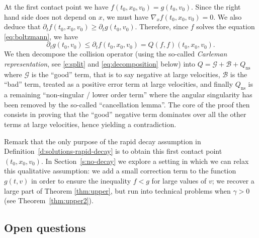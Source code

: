\documentclass[JEP,XML,SOM,Unicode,NoFloatCountersInSection]{cedram}
\newcommand{\ns}{\mathrm{ns}}
\theoremstyle{plain}
\theoremstyle{definition}
\numberwithin{equation}{section}
\begin{document}
At the first contact point we have $f(t_0,x_0,v_0)= g(t_0,v_0)$.
Since the right hand side does not depend on $x$, we must have
$\nabla_x f(t_0,x_0,v_0)=0$. We also deduce that
$\partial_t f(t_0,x_0,v_0) \geq \partial_t g(t_0,v_0)$. Therefore,
since $f$ solves the equation \eqref{eq:boltzmann}, we have
\begin{equation} \label{e:to-contradict} \partial_t g(t_0,v_0) \leq
\partial_t f (t_0,x_0,v_0)= Q(f,f) (t_0,x_0,v_0).
\end{equation}
We then decompose the collision operator (using the
so-called \emph{Carleman representation}, see \eqref{e:split} and
\eqref{eq:decomposition} below) into
$Q=\mathcal G + \mathcal B + Q_{\ns}$ where $\mathcal G$ is the
``good'' term, that is to say negative at large velocities,
$\mathcal B$ is the ``bad'' term, treated as a positive error term at
large velocities, and finally $Q_{\ns}$ is a remaining ``non-singular / lower order
term'' where the angular singularity has been
removed by the so-called ``cancellation lemma''. The core of the
proof then consists in proving that the ``good'' negative term
dominates over all the other terms at large velocities, hence yielding
a contradiction.

Remark that the only purpose of the rapid decay assumption in
Definition~\ref{d:solutions-rapid-decay} is to obtain this first
contact point $(t_0,x_0,v_0)$. In Section~\ref{s:no-decay} we explore
a setting in which we can relax this qualitative assumption: we add a
small correction term to the function $g(t,v)$ in order to ensure the
inequality $f < g$ for large values of $v$; we recover a large part of
Theorem \ref{thm:upper}, but run into technical problems when
$\gamma > 0$ (see Theorem~\ref{thm:upper2}).

\subsection{Open questions}
\end{document}
